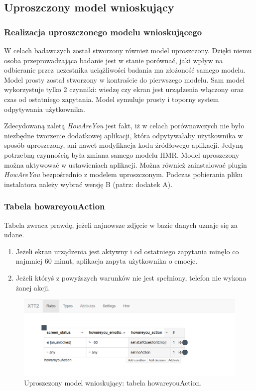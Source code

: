 \subsection{Uproszczony model wnioskujący}


\subsubsection{Realizacja uproszczonego modelu wnioskującego}

W celach badawczych został stworzony również model uproszczony. Dzięki niemu osoba przeprowadzająca badanie jest w stanie porównać, jaki wpływ na odbieranie przez uczestnika uciążliwości badania ma złożoność samego modelu. Model prosty został stworzony w kontraście do pierwszego modelu. Sam model wykorzystuje tylko 2 czynniki: wiedzę czy ekran jest urządzenia włączony oraz czas od ostatniego zapytania. Model  symuluje prosty i toporny system odpytywania użytkownika. 

Zdecydowaną zaletą \textit{HowAreYou} jest fakt, iż w celach porównawczych nie było niezbędne tworzenie dodatkowej aplikacji, która odpytywałaby użytkownika w sposób uproszczony, ani nawet modyfikacja kodu źródłowego aplikacji. Jedyną potrzebną czynnością była zmiana samego modelu HMR. Model uproszczony można aktywować w ustawieniach aplikacji. Można również zainstalować plugin \textit{HowAreYou} bezpośrednio z modelem uproszczonym. Podczas pobierania pliku instalatora należy wybrać wersję B (patrz: dodatek A).


\subsubsection{Tabela howareyouAction}

Tabela zwraca prawdę, jeżeli najnowsze zdjęcie w bazie danych uznaje się za udane. 
\begin{enumerate}
	\item Jeżeli ekran urządzenia jest aktywny i od ostatniego zapytania minęło co najmniej 60 minut, aplikacja zapyta użytkownika o emocje.
	\item Jeżeli któryś z powyższych warunków nie jest spełniony, telefon nie wykona żanej akcji.
\end{enumerate}

\begin{figure}[H]
	\centering
	\includegraphics[scale=0.8]{rozdzial4/HMR_basic.png}
	\caption{Uproszczony model wnioskujący: tabela howareyouAction.}
\end{figure}

